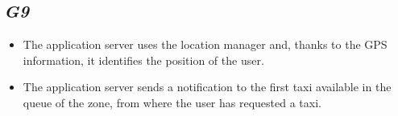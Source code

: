 	\subsection {\emph{G9}}
		\begin{itemize}
			\item The application server uses the location manager and, thanks to the GPS information, it identifies the position of the user.
			\item The application server sends a notification to the first taxi available in the queue of the zone, from where the user has requested a taxi.
		\end{itemize}
		
		
		
		
		
		
		
		
		
		
		
		
		
		
		
		
		
		
		
		
		
		
		
		
		
		
		
		
		
		
		
		
		